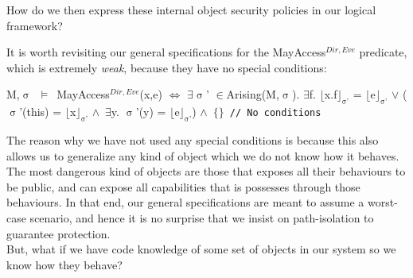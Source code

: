 \documentclass[a4paper,11pt, twoside,twocolumn]{article}
\newenvironment{logic}[1][]
{\begin{flushleft} \small }
{\end{flushleft}}
\newcommand{\loin}{$\in$}
\newcommand{\loexists}{$\exists$}
\newcommand{\loand}{$\land$}
\newcommand{\loor} {$\lor$}
\newcommand{\losigma}{$\upsigma$}
\newcommand{\loturns} {$\vDash$}
\newcommand{\loiff} {$\iff$}
\newcommand{\loexec}[2] {$\lfloor$#1$\rfloor _{\text{#2}}$}
\newcommand{\ablock} {\null\qquad}
\begin{document}
How do we then express these internal object security policies in our logical framework?

It is worth revisiting our general specifications for the MayAccess$^{Dir,Eve}$ predicate, which is extremely \textit{weak}, because they have no special conditions:
\begin{logic}[MayAccess$^{Dir,Eve}$]
M,\losigma\ \loturns\ MayAccess$^{Dir,Eve}$(x,e) \loiff \linebreak
\ablock \loexists \losigma' \loin Arising(M,\losigma).\linebreak
\ablock \loexists f. \loexec{x.f}{\losigma'} = \loexec{e}{\losigma'}
\loor \linebreak
\ablock (\losigma'(this) = \loexec{x}{\losigma'} \loand\ \loexists y. \losigma'(y) = \loexec{e}{\losigma'})\linebreak
\ablock \loand\ $\{\}$\texttt{ // No conditions}
\end{logic}

The reason why we have not used any special conditions is because this also allows us to generalize any kind of object which we do not know how it behaves. The most dangerous kind of objects are those that exposes all their behaviours to be public, and can expose all capabilities that is possesses through those behaviours. In that end, our general specifications are meant to assume a worst-case scenario, and hence it is no surprise that we insist on path-isolation to guarantee protection.\\


But, what if we have code knowledge of some set of objects in our system so we know how they behave?\\
\end{document}
